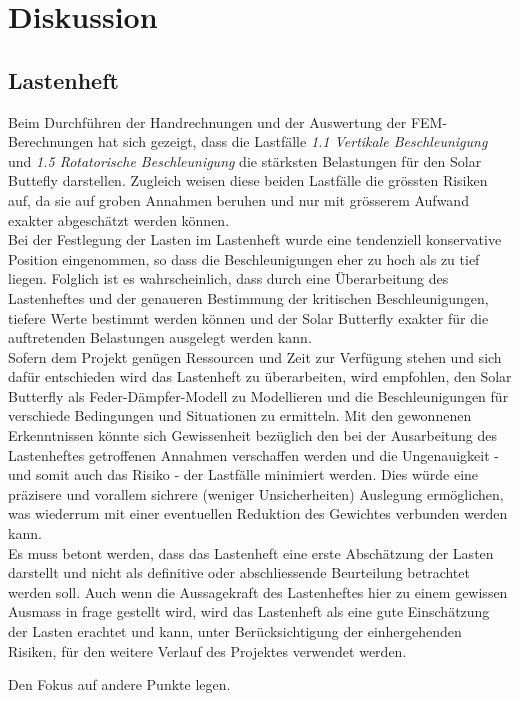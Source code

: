 \section{Diskussion}
\label{Diskussion}

\subsection{Lastenheft}
Beim Durchführen der Handrechnungen und der Auswertung der FEM-Berechnungen hat sich gezeigt, dass die Lastfälle \emph{1.1 Vertikale Beschleunigung} und \emph{1.5 Rotatorische Beschleunigung} die stärksten Belastungen für den Solar Buttefly darstellen. Zugleich weisen diese beiden Lastfälle die grössten Risiken auf, da sie auf groben Annahmen beruhen und nur mit grösserem Aufwand exakter abgeschätzt werden können.\\
Bei der Festlegung der Lasten im Lastenheft wurde eine tendenziell konservative Position eingenommen, so dass die Beschleunigungen eher zu hoch als zu tief liegen. Folglich ist es wahrscheinlich, dass durch eine Überarbeitung des Lastenheftes und der genaueren Bestimmung der kritischen Beschleunigungen, tiefere Werte bestimmt werden können und der Solar Butterfly exakter für die auftretenden Belastungen ausgelegt werden kann.\\
Sofern dem Projekt genügen Ressourcen und Zeit zur Verfügung stehen und sich dafür entschieden wird das Lastenheft zu überarbeiten, wird empfohlen, den Solar Butterfly als Feder-Dämpfer-Modell zu Modellieren und die Beschleunigungen für verschiede Bedingungen und Situationen zu ermitteln. Mit den gewonnenen Erkenntnissen könnte sich Gewissenheit bezüglich den bei der Ausarbeitung des Lastenheftes getroffenen Annahmen verschaffen werden und die Ungenauigkeit - und somit auch das Risiko - der Lastfälle minimiert werden. Dies würde eine präzisere und vorallem sichrere (weniger Unsicherheiten) Auslegung ermöglichen, was wiederrum mit einer eventuellen Reduktion des Gewichtes verbunden werden kann.\\
Es muss betont werden, dass das Lastenheft eine erste Abschätzung der Lasten darstellt und nicht als definitive oder abschliessende Beurteilung betrachtet werden soll.
Auch wenn die Aussagekraft des Lastenheftes hier zu einem gewissen Ausmass in frage gestellt wird, wird das Lastenheft als eine gute Einschätzung der Lasten erachtet und kann, unter Berücksichtigung der einhergehenden Risiken, für den weitere Verlauf des Projektes verwendet werden.

Den Fokus auf andere Punkte legen.

